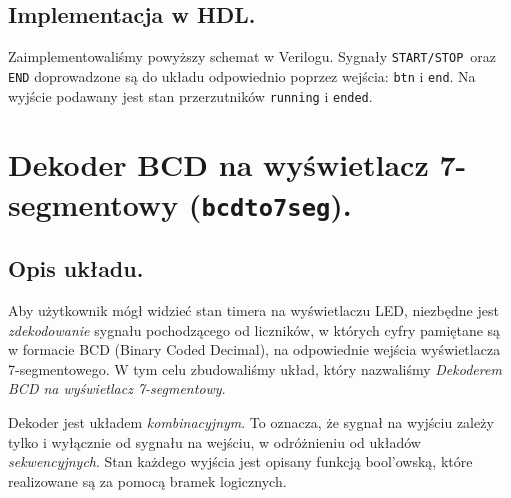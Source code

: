 \documentclass[a4paper,oneside]{report}
\newcommand{\startstop}{\texttt{START/STOP}}
\newcommand{\bcdtoseg}{\texttt{bcd\textunderscore to\textunderscore 7seg}}
\begin{document}
\subsection{Implementacja w HDL.}
Zaimplementowaliśmy powyższy schemat w Verilogu. Sygnały
\startstop\ oraz \texttt{END} doprowadzone są do układu
odpowiednio poprzez wejścia: \texttt{btn} i
\texttt{end\textunderscore}. Na wyjście podawany jest stan
przerzutników \texttt{running} i \texttt{ended}.


\section{Dekoder BCD na wyświetlacz 7-segmentowy (\bcdtoseg).}
\subsection{Opis układu.}
Aby użytkownik mógł widzieć stan timera na wyświetlaczu LED,
niezbędne jest \emph{zdekodowanie} sygnału pochodzącego od
liczników, w których cyfry pamiętane są w formacie BCD (Binary
Coded Decimal), na odpowiednie wejścia wyświetlacza 7-segmentowego.
W tym celu zbudowaliśmy układ, który nazwaliśmy \emph{Dekoderem
BCD na wyświetlacz 7-segmentowy}.

Dekoder jest układem \emph{kombinacyjnym}. To oznacza, że sygnał na
wyjściu zależy tylko i wyłącznie od sygnału na wejściu, w
odróżnieniu od układów \emph{sekwencyjnych}. Stan każdego wyjścia
jest opisany funkcją bool'owską, które realizowane są za pomocą
bramek logicznych.
\end{document}
